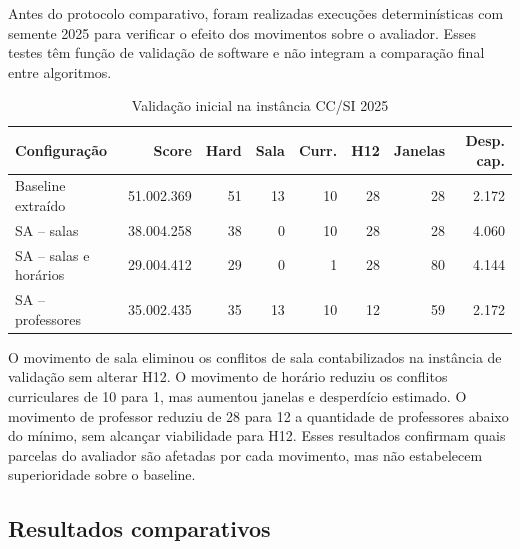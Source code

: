 Antes do protocolo comparativo, foram realizadas execuções determinísticas com semente 2025 para verificar o efeito dos movimentos sobre o avaliador. Esses testes têm função de validação de software e não integram a comparação final entre algoritmos.

\begin{table}[htbp]
\centering
\caption{Validação inicial na instância CC/SI 2025}
\label{tab:resultados_preliminares}
\small
\setlength{\tabcolsep}{3pt}
\begin{tabular}{lrrrrrrr}
\toprule
\textbf{Configuração} & \textbf{Score} & \textbf{Hard} & \textbf{Sala} & \textbf{Curr.} & \textbf{H12} & \textbf{Janelas} & \textbf{Desp. cap.} \\
\midrule
Baseline extraído & 51.002.369 & 51 & 13 & 10 & 28 & 28 & 2.172 \\
SA -- salas & 38.004.258 & 38 & 0 & 10 & 28 & 28 & 4.060 \\
SA -- salas e horários & 29.004.412 & 29 & 0 & 1 & 28 & 80 & 4.144 \\
SA -- professores & 35.002.435 & 35 & 13 & 10 & 12 & 59 & 2.172 \\
\bottomrule
\end{tabular}
\end{table}

O movimento de sala eliminou os conflitos de sala contabilizados na instância de validação sem alterar H12. O movimento de horário reduziu os conflitos curriculares de 10 para 1, mas aumentou janelas e desperdício estimado. O movimento de professor reduziu de 28 para 12 a quantidade de professores abaixo do mínimo, sem alcançar viabilidade para H12. Esses resultados confirmam quais parcelas do avaliador são afetadas por cada movimento, mas não estabelecem superioridade sobre o baseline.

\subsection{Resultados comparativos}

